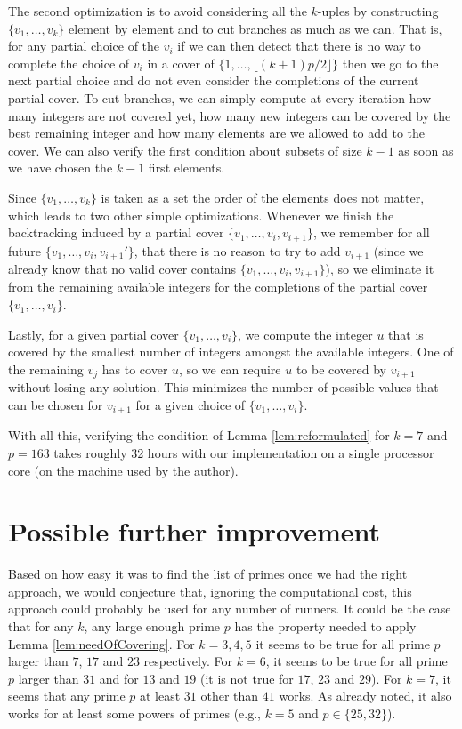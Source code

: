 \documentclass[11pt,a4paper]{article}
\theoremstyle{definition}
\theoremstyle{remark}
\begin{document}
The second optimization is to avoid considering all the $k$-uples by constructing $\{v_1,\ldots,v_k\}$ element by element and to cut branches as much as we can. That is, for any partial choice of the $v_i$ if we can then detect that there is no way to complete the choice of $v_i$ in a cover of  $\{1,\ldots, \lfloor(k+1)p/2\rfloor\}$ then we go to the next partial choice and do not even consider the completions of the current partial cover. To cut branches, we can simply compute at every iteration how many integers are not covered yet, how many new integers can be covered by the best remaining integer and how many elements are we allowed to add to the cover. We can also verify the first condition about subsets of size $k-1$ as soon as we have chosen the $k-1$ first elements. 


Since $\{v_1,\ldots,v_k\}$ is taken as a set the order of the elements does not matter, which leads to two other simple optimizations. Whenever we finish the backtracking induced by a partial cover $\{v_1,\ldots,v_i, v_{i+1}\}$, we remember for all future $\{v_1,\ldots,v_i, v_{i+1}'\}$, that there is no reason to try to add $v_{i+1}$ (since we already know that no valid cover contains $\{v_1,\ldots,v_i, v_{i+1}\}$), so we eliminate it from the remaining available integers for the completions of the partial cover $\{v_1,\ldots,v_i\}$.

Lastly, for a given partial cover $\{v_1,\ldots,v_i\}$, we compute the integer $u$ that is covered by the smallest number of integers amongst the available integers. One of the remaining $v_j$ has to cover $u$, so we can require $u$ to be covered by $v_{i+1}$ without losing any solution. This minimizes the number of possible values that can be chosen for $v_{i+1}$ for a given choice of $\{v_1,\ldots,v_i\}$.

With all this, verifying the condition of Lemma \ref{lem:reformulated} for $k=7$ and $p=163$ takes roughly 32 hours with our implementation on a single processor core (on the machine used by the author).

\section{Possible further improvement} 
Based on how easy it was to find the list of primes once we had the right approach, we would conjecture that, ignoring the computational cost, this approach could probably be used for any number of runners. It could be the case that for any $k$, any large enough prime $p$ has the property needed to apply Lemma \ref{lem:needOfCovering}. For $k=3,4,5$ it seems to be true for all prime $p$ larger than $7$, $17$ and $23$ respectively. For $k=6$, it seems to be true for all prime $p$ larger than $31$ and for $13$ and $19$ (it is not true for $17$, $23$ and $29$). For $k=7$, it seems that any prime $p$ at least $31$ other than $41$ works. As already noted, it also works for at least some powers of primes (e.g., $k=5$ and $p\in\{25,32\}$).
\end{document}
